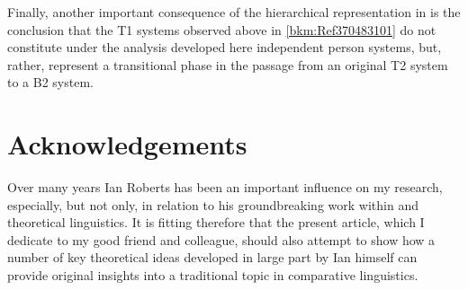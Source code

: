 \documentclass[output=paper]{langsci/langscibook}
\begin{document}
Finally, another important consequence of the hierarchical
representation in
 is the conclusion that the T1 systems observed above in
\cref{bkm:Ref370483101} do not constitute under the analysis developed here
independent person systems, but, rather, represent a transitional phase in the
passage from an original T2 system to a B2 system.

\printchapterglossary{}

\section*{Acknowledgements}

Over many years Ian Roberts has been an important influence on my research,
especially, but not only, in relation to his groundbreaking work within 
and theoretical linguistics.  It is fitting therefore that the present article,
which I dedicate to my good friend and colleague, should also attempt to show
how a number of key theoretical ideas developed in large part by Ian himself
can provide original insights into a traditional topic in comparative 
linguistics.

{\sloppy\printbibliography[heading=subbibliography,notkeyword=this]}
\end{document}
